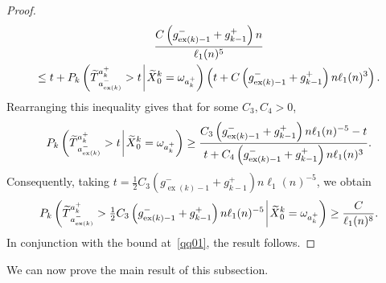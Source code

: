 \documentclass[AHL,Unicode,longabstracts,published]{cedram}
\newcommand{\Pk}{{P_k}}
\newcommand\ex{\operatorname{ex}}
\newcommand{\aat}[1]{a_{\ex(#1)}^-}
\newcommand{\gtt}[1]{g_{\ex(#1)-1}^-}
\let\oldtilde\tilde
\renewcommand*{\tilde}[1]{\mathchoice{\widetilde{#1}}{\widetilde{#1}}{\oldtilde{#1}}{\oldtilde{#1}}}
\begin{document}
\begin{proof}
\begin{multline*}
\frac{C\left(\gtt{k}+g_{k-1}^+\right)n}{\ell_1(n)^5}\\
\leq t+\Pk\left(\tilde{T}_{\aat{k}}^{a_k^+}>t\:\vline\:\tilde{X}^k_0=\omega_{a_k^+}\right)\left(t+C\left(\gtt{k}+g_{k-1}^+\right)n\ell_1(n)^3\right).
\end{multline*}
Rearranging this inequality gives that for some $C_3, C_4>0$,
\[
\Pk\left(\tilde{T}_{{\aat{k}}}^{{a_k^+}}>t\:\vline\:\tilde{X}^k_0=\omega_{a_k^+}\right)\geq
\frac{C_3\left(\gtt{k}+g_{k-1}^+\right)n \ell_1(n)^{-5}-t}{t+C_4\left(\gtt{k}+g_{k-1}^+\right)n\ell_1(n)^3}.
\]
Consequently, taking $t=\tfrac{1}{2}C_3(\gtt{k}+g_{k-1}^+)n \ell_1(n)^{-5}$, we obtain
\[
\Pk\left(\tilde{T}_{{\aat{k}}}^{{a_k^+}}>\tfrac{1}{2}C_3\left(\gtt{k}+g_{k-1}^+\right)n \ell_1(n)^{-5}\:\vline\:\tilde{X}^k_0=\omega_{a_k^+}\right)\geq \frac{C}{\ell_1(n)^{8}}.
\]
In conjunction with the bound at~\eqref{qq01}, the result follows.
\end{proof}

We can now prove the main result of this subsection.
\end{document}
